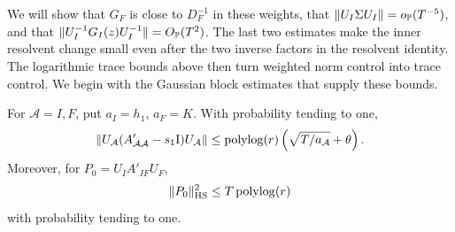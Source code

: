 We will show that \(G_F\) is close to \(D_F^{-1}\) in these weights,
that \(\|U_I\Sigma U_I\|=o_{\mathbb P}(T^{-5})\), and that
\(\|U_I^{-1}G_I(z)U_I^{-1}\|=O_{\mathbb P}(T^2)\).
The last two estimates make the inner resolvent change small even
after the two inverse factors in the resolvent identity. The logarithmic
trace bounds above then turn weighted norm control into trace control.
We begin with the Gaussian block estimates that supply these bounds.

\begin{lemma}\label{sw:weighted-blocks}
For \(\mathcal A=I,F\), put \(a_I=h_1\), \(a_F=K\). With probability tending
to one,
\begin{equation}\label{eq:sw-bernstein}
 \left\|U_{\mathcal A}
       (A'_{\mathcal A\mathcal A}-s_1\mathrm I)
       U_{\mathcal A}\right\|
 \le \operatorname{polylog}(r)
       \left(\sqrt{T/a_{\mathcal A}}+\theta\right).
\end{equation}
Moreover, for \(P_0=U_IA'_{IF}U_F\),
\begin{equation}\label{eq:sw-cross-block}
 \|P_0\|_{\mathrm{HS}}^2\le T\operatorname{polylog}(r)
\end{equation}
with probability tending to one.
\end{lemma}


